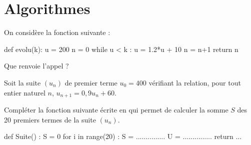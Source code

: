 \documentclass[a4paper,11pt]{article}
\begin{document}
\pagebreak

\section{Algorithmes}

\begin{cexercice}
On considère la fonction \calgpython{} suivante :

\begin{envcodepythontex}[largeur=8cm,lignes,centre=true]
	def evolu(k):
		u = 200
		n = 0
		while u < k :
			u = 1.2*u + 10
			n = n+1
		return n
\end{envcodepythontex}

Que renvoie l'appel  ?
\end{cexercice}

\begin{cexercice}
Soit la suite $\left(u_n\right)$ de premier terme $u_0= 400$ vérifiant la relation, pour tout entier naturel $n$, $u_{n+1} = 0,9u_n +60$.

Compléter la fonction  suivante écrite en \calgpython{} qui permet de calculer la somme $S$ des 20 premiers termes de la suite $\left(u_n\right)$.

\begin{envcodepythontex}[largeur=8cm,lignes,centre=true]
	def Suite() :
		S = 0
		for i in range(20) :
			S = ...............
			U = ...............
		return ...
\end{envcodepythontex}
\end{cexercice}
\end{document}
